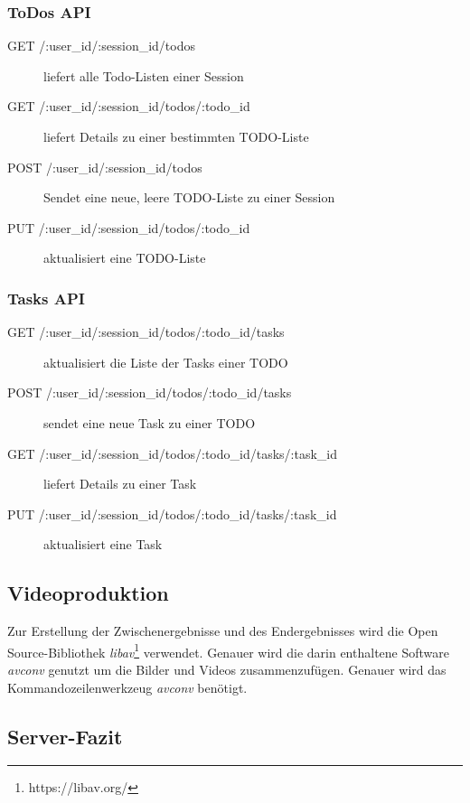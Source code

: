 \subsubsection{ToDos API}

\begin{description}

	\item[GET /:user\_id/:session\_id/todos] liefert alle Todo-Listen einer Session	
	\item[GET /:user\_id/:session\_id/todos/:todo\_id] liefert Details zu einer bestimmten TODO-Liste	
	\item[POST /:user\_id/:session\_id/todos] Sendet eine neue, leere TODO-Liste zu einer Session
	
	\item[PUT /:user\_id/:session\_id/todos/:todo\_id] aktualisiert eine TODO-Liste
	
\end{description}

\subsubsection{Tasks API}

\begin{description}

	\item[GET /:user\_id/:session\_id/todos/:todo\_id/tasks] aktualisiert die Liste der Tasks einer TODO	
	\item[POST /:user\_id/:session\_id/todos/:todo\_id/tasks] sendet eine neue Task zu einer TODO
	
	\item[GET /:user\_id/:session\_id/todos/:todo\_id/tasks/:task\_id] liefert Details zu einer Task
	
	\item[PUT /:user\_id/:session\_id/todos/:todo\_id/tasks/:task\_id] aktualisiert eine Task
	  
\end{description}


\subsection{Videoproduktion}

Zur Erstellung der Zwischenergebnisse und des Endergebnisses wird die Open Source-Bibliothek \emph{libav}\footnote{https://libav.org/} verwendet. Genauer wird die darin enthaltene Software \emph{avconv} genutzt um die Bilder und Videos zusammenzufügen. Genauer wird das Kommandozeilenwerkzeug \textit{avconv} benötigt.

\subsection{Server-Fazit}
